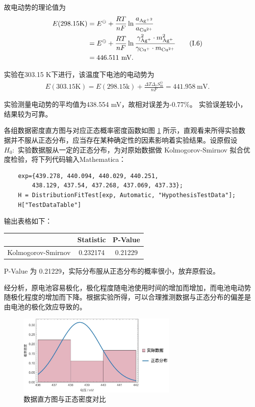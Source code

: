 \documentclass[12pt]{ctexart}
\numberwithin{equation}{section}
\begin{document}
故电动势的理论值为
\begin{align}
    E(298.15 \mathrm{K}) &= E^{\ominus} + \frac{RT}{nF}
    \ln\frac{a_{\mathrm{Ag^+}^2}}{a_{\mathrm{Cu^{2+}}}}
    \notag \\
    &= E^\ominus + \frac{RT}{nF}\ln
    \frac{\gamma_{\mathrm{Ag^+}}^2 \cdot m_{\mathrm{Ag^+}}^2}
    {\gamma_{\mathrm{Cu^+}} \cdot m_{\mathrm{Cu^{2+}}}}
    \tag{I.6} \\
    &= 446.511 ~\mathrm{mV}. \notag
\end{align}

实验在303.15 K下进行，该温度下电池的电动势为
\begin{align}
    E(303.15 \mathrm{K}) = E(298.15 \mathrm{k})
    + \frac{\Delta T \Delta_r S^{\ominus}_\text{m}}{nF}
    = 441.958~\mathrm{mV}. \tag{I.7}
\end{align}

实验测量电动势的平均值为438.554 mV，故相对误差为-0.77\%。
实验误差较小，结果较为可靠。

各组数据密度直方图与对应正态概率密度函数如图 \ref*{fig:histo*} 所示，直观看来所得实验数据并不服从正态分布，应当存在某种确定性的因素影响着实验结果。设原假设 $H_0:$ 实验数据服从一定的正态分布，为对原始数据做 Kolmogorov-Smirnov 拟合优度检验，将下列代码输入Mathematica：

\begin{lstlisting}
    exp={439.278, 440.094, 440.029, 440.251, 
        438.129, 437.54, 437.268, 437.069, 437.33};
    H = DistributionFitTest[exp, Automatic, "HypothesisTestData"];
    H["TestDataTable"]
\end{lstlisting}

输出表格如下：

\begin{longtable}{|c|c|c|}
    \hline
     & Statistic & P-Value \\
    \hline
     Kolmogorov-Smirnov & 0.232174 & 0.21229\\
    \hline
\end{longtable}

P-Value 为 0.21229，实际分布服从正态分布的概率很小，放弃原假设。

经分析，原电池容易极化，极化程度随电池使用时间的增加而增加，而电池电动势随极化程度的增加而下降。根据实验所得，可以合理推测数据与正态分布的偏差是由电池的极化效应导致的。

\begin{figure}[ht]
    \centering
    \includegraphics[width=0.7\textwidth]{Figure_2.jpg}
    \caption{数据直方图与正态密度对比}
    \label{fig:histo*}
\end{figure}
\end{document}
